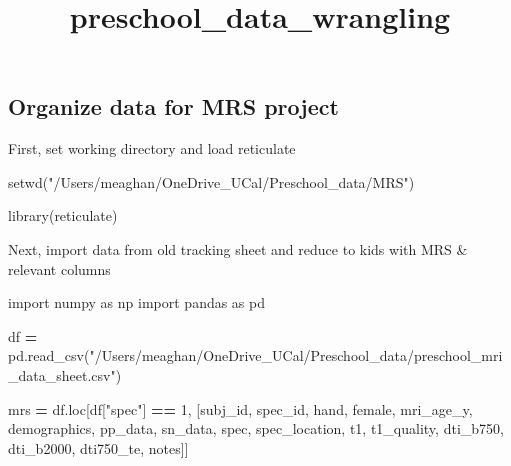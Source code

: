 \documentclass[
]{article}
\title{preschool\_data\_wrangling}
\author{}
\date{\vspace{-2.5em}}
\newenvironment{Shaded}{\begin{snugshade}}{\end{snugshade}}
\newcommand{\FunctionTok}[1]{\textcolor[rgb]{0.00,0.00,0.00}{#1}}
\newcommand{\ImportTok}[1]{#1}
\newcommand{\NormalTok}[1]{#1}
\newcommand{\OperatorTok}[1]{\textcolor[rgb]{0.81,0.36,0.00}{\textbf{#1}}}
\newcommand{\StringTok}[1]{\textcolor[rgb]{0.31,0.60,0.02}{#1}}
\begin{document}
\maketitle

\hypertarget{organize-data-for-mrs-project}{%
\subsection{Organize data for MRS
project}\label{organize-data-for-mrs-project}}

First, set working directory and load reticulate

\begin{Shaded}
\begin{Highlighting}[]
\FunctionTok{setwd}\NormalTok{(}\StringTok{"/Users/meaghan/OneDrive\_UCal/Preschool\_data/MRS"}\NormalTok{)}

\FunctionTok{library}\NormalTok{(reticulate)}
\end{Highlighting}
\end{Shaded}

Next, import data from old tracking sheet and reduce to kids with MRS \&
relevant columns

\begin{Shaded}
\begin{Highlighting}[]
\ImportTok{import}\NormalTok{ numpy }\ImportTok{as}\NormalTok{ np}
\ImportTok{import}\NormalTok{ pandas }\ImportTok{as}\NormalTok{ pd }

\NormalTok{df }\OperatorTok{=}\NormalTok{ pd.read\_csv(}\StringTok{"/Users/meaghan/OneDrive\_UCal/Preschool\_data/preschool\_mri\_data\_sheet.csv"}\NormalTok{)}

\NormalTok{mrs }\OperatorTok{=}\NormalTok{ df.loc[df[}\StringTok{"spec"}\NormalTok{] }\OperatorTok{==} \StringTok{\textquotesingle{}1\textquotesingle{}}\NormalTok{, [}\StringTok{\textquotesingle{}subj\_id\textquotesingle{}}\NormalTok{, }\StringTok{\textquotesingle{}spec\_id\textquotesingle{}}\NormalTok{, }\StringTok{\textquotesingle{}hand\textquotesingle{}}\NormalTok{, }\StringTok{\textquotesingle{}female\textquotesingle{}}\NormalTok{, }\StringTok{\textquotesingle{}mri\_age\_y\textquotesingle{}}\NormalTok{, }\StringTok{\textquotesingle{}demographics\textquotesingle{}}\NormalTok{, }\StringTok{\textquotesingle{}pp\_data\textquotesingle{}}\NormalTok{, }\StringTok{\textquotesingle{}sn\_data\textquotesingle{}}\NormalTok{, }\StringTok{\textquotesingle{}spec\textquotesingle{}}\NormalTok{, }\StringTok{\textquotesingle{}spec\_location\textquotesingle{}}\NormalTok{, }\StringTok{\textquotesingle{}t1\textquotesingle{}}\NormalTok{, }\StringTok{\textquotesingle{}t1\_quality\textquotesingle{}}\NormalTok{, }\StringTok{\textquotesingle{}dti\_b750\textquotesingle{}}\NormalTok{, }\StringTok{\textquotesingle{}dti\_b2000\textquotesingle{}}\NormalTok{, }\StringTok{\textquotesingle{}dti750\_te\textquotesingle{}}\NormalTok{, }\StringTok{\textquotesingle{}notes\textquotesingle{}}\NormalTok{]]}
\end{Highlighting}
\end{Shaded}
\end{document}
